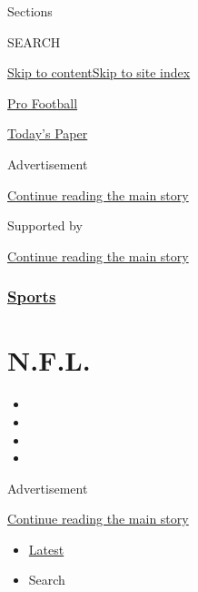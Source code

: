 Sections

SEARCH

\protect\hyperlink{site-content}{Skip to
content}\protect\hyperlink{site-index}{Skip to site index}

\href{https://www.nytimes.com/section/sports/football}{Pro Football}

\href{https://myaccount.nytimes.com/auth/login?response_type=cookie\&client_id=vi}{}

\href{https://www.nytimes.com/section/todayspaper}{Today's Paper}

Advertisement

\protect\hyperlink{after-top}{Continue reading the main story}

Supported by

\protect\hyperlink{after-sponsor}{Continue reading the main story}

\hypertarget{sports}{%
\subsubsection{\texorpdfstring{\href{/section/sports}{Sports}}{Sports}}\label{sports}}

\hypertarget{nfl}{%
\section{N.F.L.}\label{nfl}}

\begin{itemize}
\item
\item
\item
\item
\end{itemize}

Advertisement

\protect\hyperlink{after-subheader}{Continue reading the main story}

\begin{itemize}
\tightlist
\item
  \protect\hyperlink{stream-panel}{Latest}
\item
  Search
\end{itemize}

